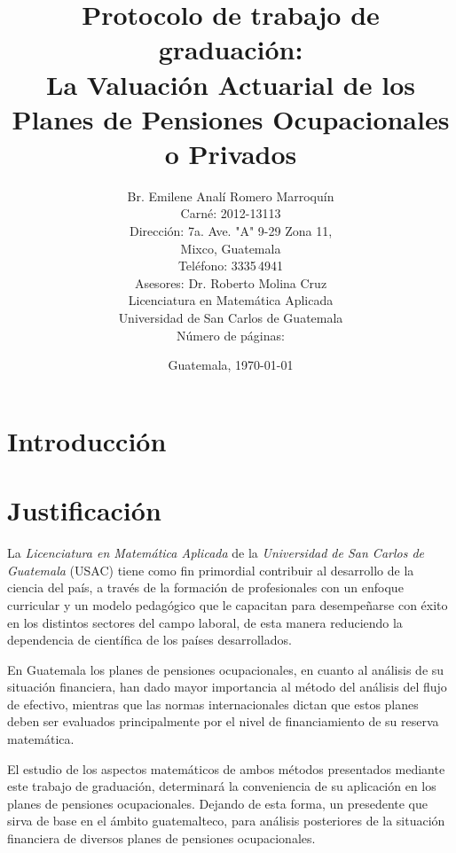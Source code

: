 \documentclass[12pt,letterpaper,titlepage]{article}
\title{Protocolo de trabajo de graduación:\\
La Valuación Actuarial de los Planes de Pensiones Ocupacionales o Privados}
\author{Br. Emilene Analí Romero Marroquín\\Carné: 2012-13113\\Dirección: 7a. Ave. "A" 9-29 Zona 11,\\Mixco, Guatemala\\Teléfono: 3335\,4941\\Asesores: Dr. Roberto Molina Cruz\\Licenciatura en Matemática Aplicada\\Universidad de San Carlos de Guatemala\\Número de páginas: \pageref{fin}}
\date{Guatemala, \today}
\begin{document}
\maketitle
\setcounter{page}{2}
\tableofcontents
\newpage
\nocite{*}
\section{Introducción}





\newpage

\section{Justificación}

La \textit{Licenciatura en Matemática Aplicada} de la \textit{Universidad de San Carlos de Guatemala} (USAC) tiene como fin primordial contribuir al desarrollo de la ciencia del país, a través de la formación de profesionales con un enfoque curricular y un modelo pedagógico que le capacitan para desempeñarse con éxito en los distintos sectores del campo laboral, de esta manera reduciendo la dependencia de científica de los países desarrollados.\bigskip

En Guatemala los planes de pensiones ocupacionales, en cuanto al análisis de su situación financiera, han dado mayor importancia al método del análisis del flujo de efectivo, mientras que las normas internacionales dictan que estos planes deben ser evaluados principalmente por el nivel de financiamiento de su reserva matemática.  \bigskip

El estudio de los aspectos matemáticos de ambos métodos presentados mediante este trabajo de graduación, determinará la conveniencia de su aplicación en los planes de pensiones ocupacionales. Dejando de esta forma, un presedente que sirva de base en el ámbito guatemalteco, para análisis posteriores de la situación financiera de diversos planes de pensiones ocupacionales.



\newpage
\end{document}

